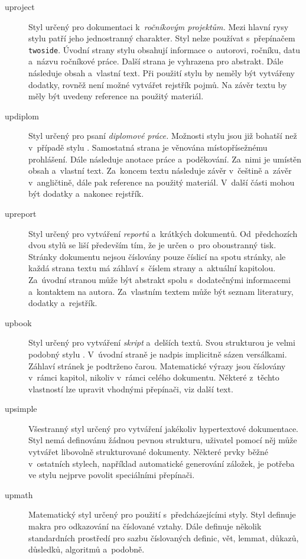 \documentclass[12pt]{article}
\begin{document}
\begin{description}

\item[{\sf uproject}]
  Styl určený pro dokumentaci k~\emph{ročníkovým projektům.} Mezi hlavní rysy
  stylu patří jeho jednostranný charakter. Styl nelze používat s~přepínačem
  \texttt{twoside}. Úvodní strany stylu obsahují informace o~autorovi, 
  ročníku, datu a~názvu ročníkové práce. Další strana je vyhrazena pro
  abstrakt. Dále následuje obsah a~vlastní text. 
  Při použití stylu  by neměly být vytvářeny dodatky, rovněž
  není možné vytvářet rejstřík pojmů. Na závěr textu by měly být uvedeny
  reference na použitý materiál.

\item[{\sf updiplom}]
  Styl určený pro psaní \emph{diplomové práce.} Možnosti stylu jsou již 
  bohatší než v~případě stylu . Samostatná strana je věnována
  místopřísežnému prohlášení. Dále následuje anotace práce a~poděkování.
  Za~nimi je umístěn obsah a~vlastní text.
  Za~koncem textu následuje závěr v~češtině a~závěr v~angličtině, dále pak
  reference na použitý materiál.
  V~další části mohou být dodatky a~nakonec rejstřík.

\item[{\sf upreport}]
  Styl určený pro vytváření \emph{reportů} a~krátkých dokumentů.
  Od~předchozích dvou stylů se  liší především tím, že je určen
  o~pro oboustranný tisk. Stránky dokumentu nejsou číslovány pouze číslicí
  na spotu stránky, ale každá strana textu má záhlaví s~číslem strany 
  a~aktuální kapitolou. Za~úvodní stranou může být abstrakt spolu 
  s~dodatečnými informacemi a~kontaktem na autora. Za~vlastním textem
  může být seznam literatury, dodatky a~rejstřík.
  
\item[{\sf upbook}]
  Styl určený pro vytváření \emph{skript} a~delších textů. Svou strukturou je
  velmi podobný stylu . V~úvodní straně je nadpis implicitně
  sázen versálkami. Záhlaví stránek je podtrženo čarou. Matematické výrazy
  jsou číslovány v~rámci kapitol, nikoliv v~rámci celého dokumentu. Některé
  z~těchto vlastností lze upravit vhodnými přepínači, viz další text.

\item[{\sf upsimple}]
  Všestranný styl určený pro vytváření jakékoliv hypertextové dokumentace.
  Styl nemá definovánu žádnou pevnou strukturu, uživatel pomocí něj může 
  vytvářet libovolně strukturované dokumenty. Některé prvky běžné v~ostatních
  stylech, například automatické generování záložek, je potřeba ve stylu
   nejprve povolit speciálními přepínači.
  
\item[{\sf upmath}]
  Matematický styl určený pro použití s~předcházejícími styly. Styl definuje
  makra pro odkazování na číslované vztahy. Dále definuje několik 
  standardních prostředí pro sazbu číslovaných definic, vět, lemmat, důkazů,
  důsledků, algoritmů a~podobně.
  
\end{description}
\end{document}
